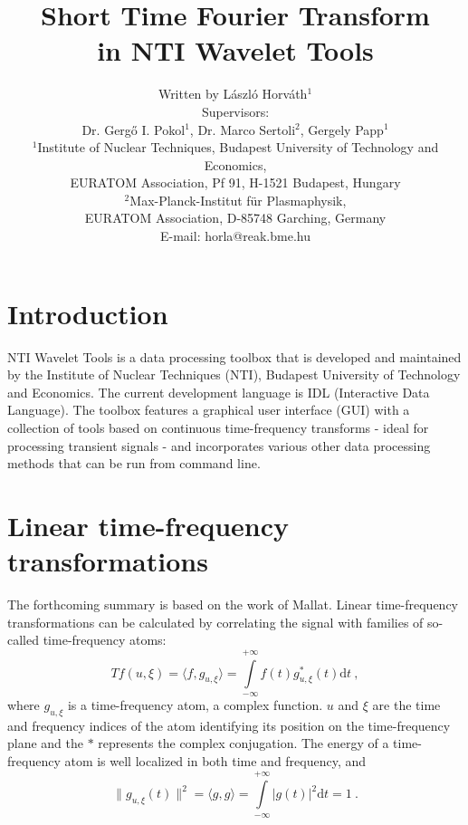 \documentclass[a4paper,12pt,oneside]{article}
\title{\textbf{Short Time Fourier Transform\\in NTI Wavelet Tools}}
\author{
Written by László Horváth$^1$ \vspace{0.3 cm}\\
Supervisors:\\
Dr. Gergő I. Pokol$^1$, Dr. Marco Sertoli$^2$, Gergely Papp$^1$ \vspace{0.3 cm}\\ 
{\footnotesize $^1$Institute of Nuclear Techniques, Budapest University of Technology and Economics,}\vspace{-0.2 cm}\\
{\footnotesize EURATOM Association, Pf 91, H-1521 Budapest, Hungary
}\\
{\footnotesize $^2$Max-Planck-Institut für Plasmaphysik,}\vspace{-0.2 cm}\\
{\footnotesize EURATOM Association, D-85748 Garching, Germany}\\
{\footnotesize E-mail: horla@reak.bme.hu}}
\newcommand{\dt}{\mathrm{d}t}
\begin{document}
\maketitle

\clearpage
\tableofcontents


\thispagestyle{empty}
\newpage

\section{Introduction}

NTI Wavelet Tools\cite{nti12} is a data processing toolbox that is developed and maintained by the Institute of Nuclear Techniques (NTI), Budapest University of Technology and Economics. The current development language is IDL\cite{idl12} (Interactive Data Language). The toolbox features a graphical user interface (GUI) with a collection of tools based on continuous time-frequency transforms - ideal for processing transient signals - and incorporates various other data processing methods that can be run from command line.

\section{Linear time-frequency transformations}

The forthcoming summary is based on the work of Mallat\cite{mallat08wavelet}. Linear time-frequency transformations can be calculated by correlating the signal with families of so-called time-frequency atoms:
\begin{equation}\label{eq:transform}
  T f(u,\xi) = \langle f, g_{u, \xi} \rangle = \int\limits_{-\infty}^{+\infty} f(t) g^*_{u, \xi}(t) \dt\ ,
\end{equation}
where $g_{u, \xi}$ is a time-frequency atom, a complex function. $u$ and $\xi$ are the time and frequency indices of the atom identifying its position on the time-frequency plane and the $*$ represents the complex conjugation. The energy of a time-frequency atom is well localized in both time and frequency, and
\begin{equation}
  \| g_{u, \xi}(t) \|^2 = \langle g,g \rangle = \int\limits_{-\infty}^{+\infty} |g(t)|^2 \dt = 1 \ .
\end{equation}
\end{document}
